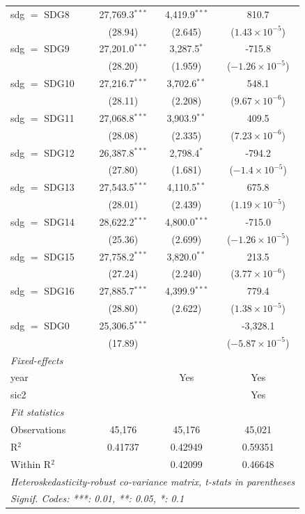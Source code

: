 \begin{tabular}{lccc}
   sdg $=$ SDG8  & 27,769.3$^{***}$ & 4,419.9$^{***}$ & 810.7\\   
                 & (28.94)          & (2.645)         & ($1.43\times 10^{-5}$)\\    
   sdg $=$ SDG9  & 27,201.0$^{***}$ & 3,287.5$^{*}$   & -715.8\\   
                 & (28.20)          & (1.959)         & ($-1.26\times 10^{-5}$)\\    
   sdg $=$ SDG10 & 27,216.7$^{***}$ & 3,702.6$^{**}$  & 548.1\\   
                 & (28.11)          & (2.208)         & ($9.67\times 10^{-6}$)\\    
   sdg $=$ SDG11 & 27,068.8$^{***}$ & 3,903.9$^{**}$  & 409.5\\   
                 & (28.08)          & (2.335)         & ($7.23\times 10^{-6}$)\\    
   sdg $=$ SDG12 & 26,387.8$^{***}$ & 2,798.4$^{*}$   & -794.2\\   
                 & (27.80)          & (1.681)         & ($-1.4\times 10^{-5}$)\\    
   sdg $=$ SDG13 & 27,543.5$^{***}$ & 4,110.5$^{**}$  & 675.8\\   
                 & (28.01)          & (2.439)         & ($1.19\times 10^{-5}$)\\    
   sdg $=$ SDG14 & 28,622.2$^{***}$ & 4,800.0$^{***}$ & -715.0\\   
                 & (25.36)          & (2.699)         & ($-1.26\times 10^{-5}$)\\    
   sdg $=$ SDG15 & 27,758.2$^{***}$ & 3,820.0$^{**}$  & 213.5\\   
                 & (27.24)          & (2.240)         & ($3.77\times 10^{-6}$)\\    
   sdg $=$ SDG16 & 27,885.7$^{***}$ & 4,399.9$^{***}$ & 779.4\\   
                 & (28.80)          & (2.622)         & ($1.38\times 10^{-5}$)\\    
   sdg $=$ SDG0  & 25,306.5$^{***}$ &                 & -3,328.1\\   
                 & (17.89)          &                 & ($-5.87\times 10^{-5}$)\\    
   \midrule
   \emph{Fixed-effects}\\
   year          &                  & Yes             & Yes\\  
   sic2          &                  &                 & Yes\\  
   \midrule
   \emph{Fit statistics}\\
   Observations  & 45,176           & 45,176          & 45,021\\  
   R$^2$         & 0.41737          & 0.42949         & 0.59351\\  
   Within R$^2$  &                  & 0.42099         & 0.46648\\  
   \midrule \midrule
   \multicolumn{4}{l}{\emph{Heteroskedasticity-robust co-variance matrix, t-stats in parentheses}}\\
   \multicolumn{4}{l}{\emph{Signif. Codes: ***: 0.01, **: 0.05, *: 0.1}}\\
\end{tabular}
\par\endgroup


